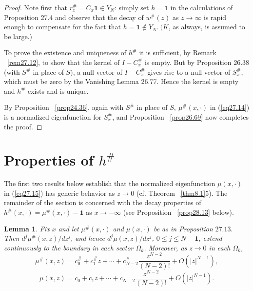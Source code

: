 \documentclass{surv-l}
\theoremstyle{plain}
\newtheorem{lem}[theorem]{\sc Lemma}
\theoremstyle{definition}
\numberwithin{equation}{chapter}
\begin{document}
\begin{proof} Note first that $r_{x}^{\#}=C_{x}\mathbf{1} \in Y_{N}$: simply set $h=\mathbf{1}$ in the calculations of Proposition 27.4 and observe that the decay of $w^{\#}(z)$ as $ z\rightarrow\infty$ is rapid enough to compensate for the fact that $h=\mathbf{1}\not\in Y_{N}.\ (K$, as always, is assumed to be large.)

To prove the existence and uniqueness of $h^{\#}$ it is sufficient, by Remark ~\ref{rem27.12}, to show that the kernel of $I-C_{x}^{\#}$ is empty. But by Proposition 26.38 (with $ S^{\#}$ in place of $S$), a null vector of $ I-C_{x}^{\#}$ gives rise to a null vector of $S_{x}^{\#}$, which must be zero by the Vanishing Lemma 26.77. Hence the kernel is empty and $h^{\#}$ exists and is unique.

By Proposition ~\ref{prop24.36}, again with $S^{\#}$ in place of $S,\ \mu^{\#}(x, \cdot)$ in (\ref{eq27.14}) is a normalized eigenfunction for $S_{x}^{\#}$, and Proposition ~\ref{prop26.69} now completes the proof.
\end{proof}

\section{Properties of $h^{\#}$}\label{sec28}
\renewcommand\theequation{\arabic{section}.\arabic{equation}}

The first two results below establish that the normalized eigenfunction $\mu(x, \cdot)$ in (\ref{eq27.15}) has generic behavior as $z\rightarrow 0$ (cf. Theorem ~\ref{thm8.1}5). The remainder of the section is concerned with the decay properties of $h^{\#}(x, \cdot)=\mu^{\#}(x, \cdot)-\mathbf{1}$ as $ x\rightarrow-\infty$ (see Proposition ~\ref{prop28.13} below).
\renewcommand\thetheorem{28.\arabic{theorem}}
\begin{lem}\label{lem28.1}  Fix $x$ and let $\mu^{\#}(x, \cdot)$ \emph{and} $\mu(x, \cdot)$ be as in  Proposition $27.13.$ Then $d^{j}\mu^{\#}(x, z)/dz^{j}$, and hence $d^{j}\mu(x,z)/dz^{j}$, $0\leq j\leq N-\mathbf{1}$, extend continuously to the boundary in each sector $\Omega_{k}$. Moreover, as $z\rightarrow 0$ in each $\Omega_{k}$,
\setcounter{equation}{1}
\begin{equation}\label{eq28.2}
\mu^{\#}(x, z)=c_{0}^{\#}+c_{1}^{\#}z+\cdots +c_{N-2}^{\#}\frac{z^{N-2}}{(N-2)!}+O(|z|^{N-1}),
\end{equation}
\begin{equation}\label{eq28.3}
\mu(x,z)=c_{0}+c_{1}z+\cdots +c_{N-2}\frac{z^{N-2}}{(N-2)!}+O(|z|^{N-1}).
\end{equation}
\end{lem}
\end{document}
